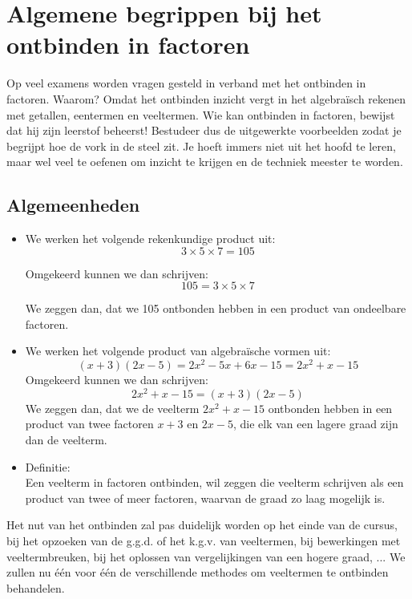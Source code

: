 \documentclass[12pt]{article}
\begin{document}
\ConfigureExSol

\setcounter{section}{24}
\section{Algemene begrippen bij het ontbinden in factoren}

Op veel examens worden vragen gesteld in verband met het ontbinden in factoren. Waarom? Omdat het ontbinden inzicht vergt in het algebraïsch rekenen met getallen, eentermen en veeltermen.
Wie kan ontbinden in factoren, bewijst dat hij zijn leerstof beheerst!
Bestudeer dus de uitgewerkte voorbeelden zodat je begrijpt hoe de vork in de steel zit.
Je hoeft immers niet uit het hoofd te leren, maar wel veel te oefenen om inzicht te krijgen en de techniek meester te worden.

\subsection{Algemeenheden}

\begin{itemize}
  \item We werken het volgende rekenkundige product uit:
$$3\times 5\times 7 = 105$$

Omgekeerd kunnen we dan schrijven:
$$105 = 3\times 5\times 7$$

We zeggen dan, dat we 105 ontbonden hebben in een product van ondeelbare factoren.
  \item We werken het volgende product van algebraïsche vormen uit:
	$$(x + 3)(2x-5) = 2x^2 - 5x + 6x - 15 = 2x^2 + x - 15$$
	Omgekeerd kunnen we dan schrijven:
	$$2x^2 + x - 15 = (x + 3)(2x - 5)$$
	We zeggen dan, dat we de veelterm $2x^2 + x - 15$ ontbonden hebben in een product van twee factoren $x + 3$ en $2x - 5$, die elk van een lagere graad zijn dan de veelterm.
	
	\item Definitie:\\
	Een veelterm in factoren ontbinden, wil zeggen die veelterm schrijven als een product van twee of meer factoren, waarvan de graad zo laag mogelijk is.
\end{itemize}

Het nut van het ontbinden zal pas duidelijk worden op het einde van de cursus, bij het opzoeken van de g.g.d. of het k.g.v. van veeltermen, bij bewerkingen met veeltermbreuken, bij het oplossen van vergelijkingen van een hogere graad, ... We zullen nu één voor één de verschillende methodes om veeltermen te ontbinden behandelen.
\end{document}
